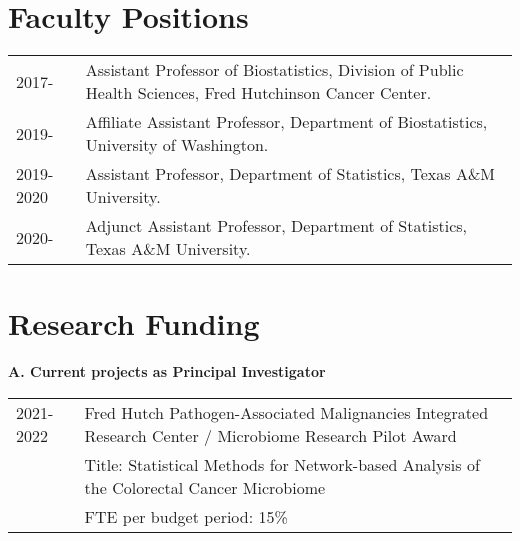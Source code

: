 \documentclass[10pt]{article}
\begin{document}
\section{Faculty Positions} 
\begin{table}[H]
\hskip0.9cm\begin{tabular}{p{1.6cm}p{12cm}}
2017- & Assistant Professor of Biostatistics, Division of Public Health Sciences, Fred Hutchinson Cancer Center. \\
2019- & Affiliate Assistant Professor, Department of Biostatistics, University of Washington.  \\
2019-2020  & Assistant Professor, Department of Statistics, Texas A\&M University.\\
2020- & Adjunct Assistant Professor, Department of Statistics, Texas A\&M University.
\end{tabular}
\end{table}


\section*{Research Funding }

\textbf{A. Current projects as Principal Investigator}
\begin{table}[H]
\hskip0.9cm\begin{tabular}{p{1.6cm}p{12cm}}
2021-2022 & Fred Hutch Pathogen-Associated Malignancies Integrated Research Center / Microbiome Research Pilot Award  \\
& Title: Statistical Methods for Network-based Analysis of the Colorectal Cancer Microbiome \\
& FTE per budget period: 15\%
\end{tabular}
\end{table}
\end{document}
